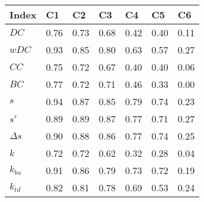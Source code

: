 \documentclass[onecolumn]{article} %
\begin{document}
\begin{table}[ht]
\centering
\begin{tabular}{lllllll}
  \hline
Index & C1 & C2 & C3 & C4 & C5 & C6 \\
  \hline
\(\displaystyle DC \) & {\color[HTML]{00D768} 0.76} & {\color[HTML]{EF2A00} 0.73} & {\color[HTML]{0051D7} 0.68} & {\color[HTML]{6200D7} 0.42} & {\color{orange} 0.40} & {\color[HTML]{9B9B9B} 0.11} \\
\(\displaystyle wDC \) &   {\color[HTML]{EF2A00} 0.93} & {\color[HTML]{00D768} 0.85} & {\color[HTML]{0051D7} 0.80} & {\color{orange} 0.63} & {\color[HTML]{6200D7} 0.57} & {\color[HTML]{9B9B9B} 0.27} \\
\(\displaystyle CC \) &   {\color[HTML]{00D768} 0.75} & {\color[HTML]{EF2A00} 0.72} & {\color[HTML]{0051D7} 0.67} & {\color[HTML]{6200D7} 0.40} & {\color{orange} 0.40} & {\color[HTML]{9B9B9B} 0.06} \\
\(\displaystyle BC \) &   {\color[HTML]{00D768} 0.77} & {\color[HTML]{0051D7} 0.72} & {\color[HTML]{EF2A00} 0.71} & {\color{orange} 0.46} & {\color[HTML]{6200D7} 0.33} & {\color[HTML]{9B9B9B} 0.00} \\
\(\displaystyle s \) &   {\color[HTML]{00D768} 0.94} & {\color[HTML]{EF2A00} 0.87} & {\color[HTML]{0051D7} 0.85} & {\color{orange} 0.79} & {\color[HTML]{6200D7} 0.74} & {\color[HTML]{9B9B9B} 0.23} \\
\(\displaystyle s' \) &   {\color[HTML]{EF2A00} 0.89} & {\color[HTML]{0051D7} 0.89} & {\color[HTML]{00D768} 0.87} & {\color[HTML]{6200D7} 0.77} & {\color{orange} 0.71} & {\color[HTML]{9B9B9B} 0.27} \\
\(\displaystyle \Delta s \) &   {\color[HTML]{00D768} 0.90} & {\color[HTML]{EF2A00} 0.88} & {\color[HTML]{0051D7} 0.86} & {\color[HTML]{6200D7} 0.77} & {\color{orange} 0.74} & {\color[HTML]{9B9B9B} 0.25} \\
\(\displaystyle k \) &   {\color[HTML]{00D768} 0.72} & {\color[HTML]{EF2A00} 0.72} & {\color[HTML]{0051D7} 0.62} & {\color[HTML]{6200D7} 0.32} & {\color{orange} 0.28} & {\color[HTML]{9B9B9B} 0.04} \\
\(\displaystyle k_{bu} \) &   {\color[HTML]{00D768} 0.91} & {\color[HTML]{EF2A00} 0.86} & {\color[HTML]{0051D7} 0.79} & {\color[HTML]{6200D7} 0.73} & {\color{orange} 0.72} & {\color[HTML]{9B9B9B} 0.19} \\
\(\displaystyle k_{td} \) &   {\color[HTML]{EF2A00} 0.82} & {\color[HTML]{00D768} 0.81} & {\color[HTML]{0051D7} 0.78} & {\color[HTML]{6200D7} 0.69} & {\color{orange} 0.53} & {\color[HTML]{9B9B9B} 0.24} \\

\end{tabular}
\end{table}
\end{document}
